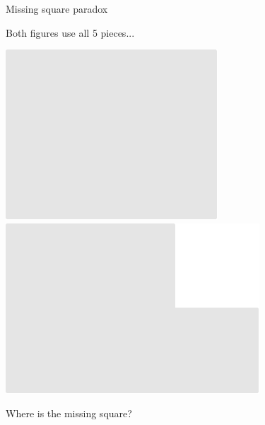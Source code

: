 \documentclass[14pt]{beamer}
\begin{document}

    \begin{frame}{Missing square paradox}
        \begin{center}
            Both figures use all 5 pieces...

            \vspace{36pt}

            \;\;\includegraphics[scale=0.5]{figures/figure022b.pdf}\qquad
            \qquad
            \includegraphics[scale=0.5]{figures/figure022e.pdf}

            \vspace{32pt}

            Where is the missing square?
        \end{center}
    \end{frame}
\end{document}
